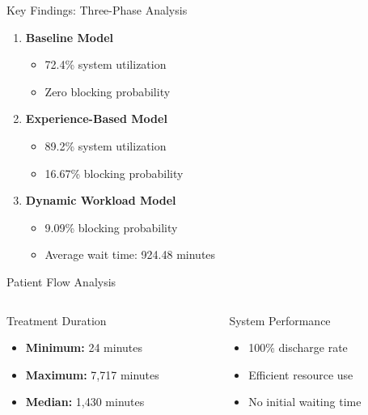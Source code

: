 \documentclass[aspectratio=169]{beamer}  %
\begin{document}
\begin{frame}{Key Findings: Three-Phase Analysis}
    \begin{enumerate}
        \item \textbf{Baseline Model}
            \begin{itemize}
                \item 72.4\% system utilization
                \item Zero blocking probability
            \end{itemize}
        \vspace{0.3em}
        \item \textbf{Experience-Based Model}
            \begin{itemize}
                \item 89.2\% system utilization
                \item 16.67\% blocking probability
            \end{itemize}
        \vspace{0.3em}
        \item \textbf{Dynamic Workload Model}
            \begin{itemize}
                \item 9.09\% blocking probability
                \item Average wait time: 924.48 minutes
            \end{itemize}
    \end{enumerate}
\end{frame}

\begin{frame}{Patient Flow Analysis}
    \begin{columns}[T]
        \begin{column}{0.48\textwidth}
            \begin{block}{Treatment Duration}
                \begin{itemize}
                    \item \textbf{Minimum:} 24 minutes
                    \item \textbf{Maximum:} 7,717 minutes
                    \item \textbf{Median:} 1,430 minutes
                \end{itemize}
            \end{block}
        \end{column}
        \begin{column}{0.48\textwidth}
            \begin{block}{System Performance}
                \begin{itemize}
                    \item 100\% discharge rate
                    \item Efficient resource use
                    \item No initial waiting time
                \end{itemize}
            \end{block}
        \end{column}
    \end{columns}
\end{frame}
\end{document}
